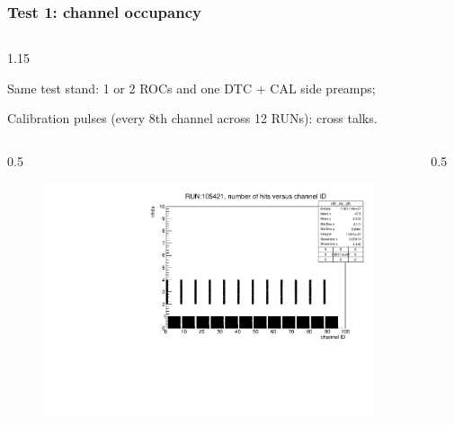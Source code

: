 \documentclass{beamer}
\begin{document}
\begin{frame}
    \frametitle{Test 1: channel occupancy}
    \vspace{-3mm}
    \begin{columns}
\begin{column}{1.15\framewidth}
    \setlength{\leftmargini}{1.2em}
 \begin{itemize}
{\footnotesize  \item Same test stand: 1 or 2 ROCs and one DTC + CAL side preamps;
\vspace{-0.7mm}
\item  Calibration pulses (every 8th channel across 12 RUNs): cross talks.}
  \end{itemize}
    \end{column}
    \end{columns}
        \vspace{-3mm}
    \begin{columns}
\begin{column}{0.5\framewidth}
         \begin{figure}[!h]
      \centering
      \hspace*{-2em}
      \includegraphics[width=0.95\columnwidth]{figures/pdf/run105421_nh_vs_ch.pdf}
     \label{fig:normalhits}
\end{figure}
\end{column}
\begin{column}{0.5\framewidth}
      \begin{figure}[!h]
      \centering
            \hspace*{-1em}

\end{figure}
\end{column}
\end{columns}
\end{frame}
\end{document}
